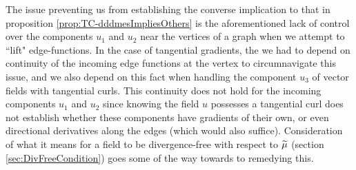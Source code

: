 The issue preventing us from establishing the converse implication to that in proposition \ref{prop:TC-dddmesImpliesOthers} is the aforementioned lack of control over the components $u_1$ and $u_2$ near the vertices of a graph when we attempt to ``lift" edge-functions.
In the case of tangential gradients, the we had to depend on continuity of the incoming edge functions at the vertex to circumnavigate this issue, and we also depend on this fact when handling the component $u_3$ of vector fields with tangential curls.
This continuity does not hold for the incoming components $u_1$ and $u_2$ since knowing the field $u$ possesses a tangential curl does not establish whether these components have gradients of their own, or even directional derivatives along the edges (which would also suffice).
Consideration of what it means for a field to be divergence-free with respect to $\widetilde{\mu}$ (section \ref{sec:DivFreeCondition}) goes some of the way towards to remedying this.